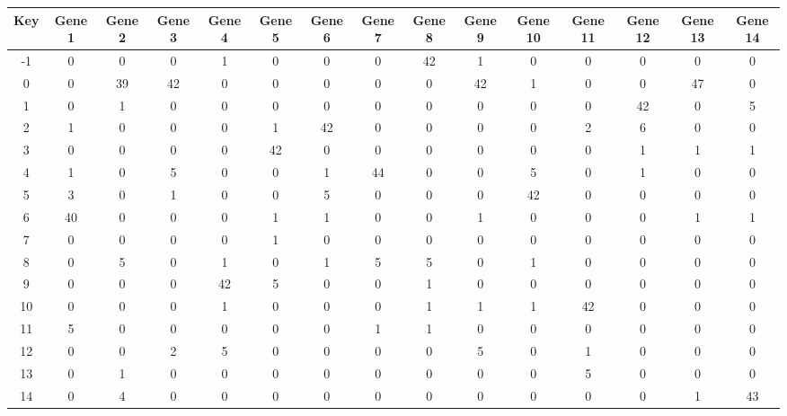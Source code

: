 \begin{tabular}{|c|c|c|c|c|c|c|c|c|c|c|c|c|c|c|}
\hline
Key & Gene 1 & Gene 2 & Gene 3 & Gene 4 & Gene 5 & Gene 6 & Gene 7 & Gene 8 & Gene 9 & Gene 10 & Gene 11 & Gene 12 & Gene 13 & Gene 14 \\
\hline
-1 & 0 & 0 & 0 & 1 & 0 & 0 & 0 & 42 & 1 & 0 & 0 & 0 & 0 & 0 \\
0 & 0 & 39 & 42 & 0 & 0 & 0 & 0 & 0 & 42 & 1 & 0 & 0 & 47 & 0 \\
1 & 0 & 1 & 0 & 0 & 0 & 0 & 0 & 0 & 0 & 0 & 0 & 42 & 0 & 5 \\
2 & 1 & 0 & 0 & 0 & 1 & 42 & 0 & 0 & 0 & 0 & 2 & 6 & 0 & 0 \\
3 & 0 & 0 & 0 & 0 & 42 & 0 & 0 & 0 & 0 & 0 & 0 & 1 & 1 & 1 \\
4 & 1 & 0 & 5 & 0 & 0 & 1 & 44 & 0 & 0 & 5 & 0 & 1 & 0 & 0 \\
5 & 3 & 0 & 1 & 0 & 0 & 5 & 0 & 0 & 0 & 42 & 0 & 0 & 0 & 0 \\
6 & 40 & 0 & 0 & 0 & 1 & 1 & 0 & 0 & 1 & 0 & 0 & 0 & 1 & 1 \\
7 & 0 & 0 & 0 & 0 & 1 & 0 & 0 & 0 & 0 & 0 & 0 & 0 & 0 & 0 \\
8 & 0 & 5 & 0 & 1 & 0 & 1 & 5 & 5 & 0 & 1 & 0 & 0 & 0 & 0 \\
9 & 0 & 0 & 0 & 42 & 5 & 0 & 0 & 1 & 0 & 0 & 0 & 0 & 0 & 0 \\
10 & 0 & 0 & 0 & 1 & 0 & 0 & 0 & 1 & 1 & 1 & 42 & 0 & 0 & 0 \\
11 & 5 & 0 & 0 & 0 & 0 & 0 & 1 & 1 & 0 & 0 & 0 & 0 & 0 & 0 \\
12 & 0 & 0 & 2 & 5 & 0 & 0 & 0 & 0 & 5 & 0 & 1 & 0 & 0 & 0 \\
13 & 0 & 1 & 0 & 0 & 0 & 0 & 0 & 0 & 0 & 0 & 5 & 0 & 0 & 0 \\
14 & 0 & 4 & 0 & 0 & 0 & 0 & 0 & 0 & 0 & 0 & 0 & 0 & 1 & 43 \\
\hline
\end{tabular}